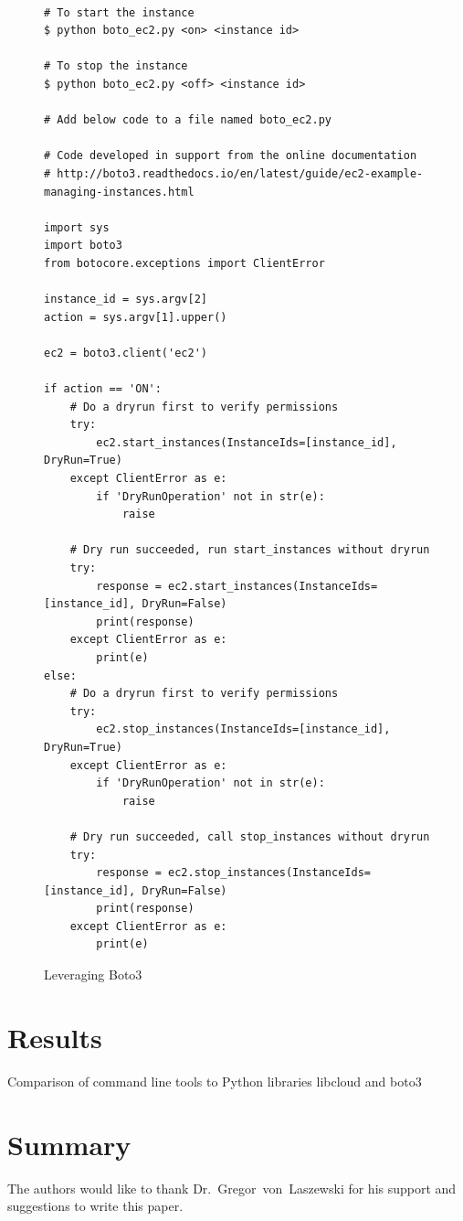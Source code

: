 \begin{figure}[htb]

\begin{verbatim}

# To start the instance
$ python boto_ec2.py <on> <instance id>

# To stop the instance
$ python boto_ec2.py <off> <instance id>

# Add below code to a file named boto_ec2.py

# Code developed in support from the online documentation
# http://boto3.readthedocs.io/en/latest/guide/ec2-example-managing-instances.html

import sys
import boto3
from botocore.exceptions import ClientError

instance_id = sys.argv[2]
action = sys.argv[1].upper()

ec2 = boto3.client('ec2')

if action == 'ON':
    # Do a dryrun first to verify permissions
    try:
        ec2.start_instances(InstanceIds=[instance_id], DryRun=True)
    except ClientError as e:
        if 'DryRunOperation' not in str(e):
            raise

    # Dry run succeeded, run start_instances without dryrun
    try:
        response = ec2.start_instances(InstanceIds=[instance_id], DryRun=False)
        print(response)
    except ClientError as e:
        print(e)
else:
    # Do a dryrun first to verify permissions
    try:
        ec2.stop_instances(InstanceIds=[instance_id], DryRun=True)
    except ClientError as e:
        if 'DryRunOperation' not in str(e):
            raise

    # Dry run succeeded, call stop_instances without dryrun
    try:
        response = ec2.stop_instances(InstanceIds=[instance_id], DryRun=False)
        print(response)
    except ClientError as e:
        print(e)

\end{verbatim}

\caption{Leveraging Boto3 \cite{hid-sp18-518-Boto3}}\label{c:boto3-example}

\end{figure}

\section{Results}

Comparison of command line tools to Python libraries libcloud and boto3

\section{Summary}

\begin{acks}

  The authors would like to thank Dr.~Gregor~von~Laszewski for his
  support and suggestions to write this paper.

\end{acks}


 

